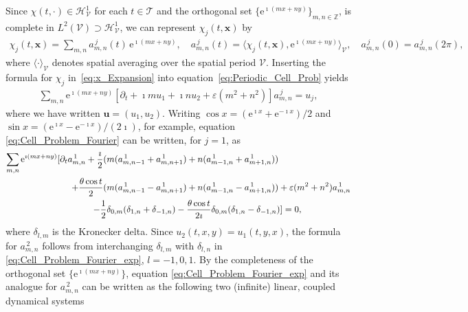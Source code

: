 \documentclass{article}
\newcommand{\e}{\mathrm{e}}
\newcommand{\Hc}{\mathcal{H}}
\newcommand{\Tc}{\mathcal{T}}
\newcommand{\Vc}{\mathcal{V}}
\newcommand{\vecx}{\mathbf{x}}
\newcommand{\vecu}{\mathbf{u}}
\begin{document}
Since $\chi(t,\cdot)\in\Hc^1_{\Vc}$ for each $t\in\Tc$ and the orthogonal set
$\{\e^{\imath (mx+ny)}\}_{m,n\in\mathbb{Z}}$, is complete in $L^2(\Vc)\supset\Hc^1_{\Vc}$, we can
represent $\chi_j(t,\vecx)$ by  
%
\begin{align}\label{eq:x_Expansion}
  \chi_j(t,\vecx)=\sum_{m,n}a^{\,j}_{m,n}(t)\,\e^{\imath (mx+ny)},
  \quad
  a^{\,j}_{m,n}(t)=\langle\chi_j(t,\vecx),\e^{\imath (mx+ny)}\rangle_{\Vc},
  \quad
  a^{\,j}_{m,n}(0)=a^{\,j}_{m,n}(2\pi),
\end{align}
%
where $\langle\cdot\rangle_{\Vc}$ denotes spatial averaging over the spatial period $\Vc$.
Inserting the formula for $\chi_j$ in~\eqref{eq:x_Expansion} into
equation~\eqref{eq:Periodic_Cell_Prob} yields  
%
\begin{align}\label{eq:Cell_Problem_Fourier}
  \sum_{m,n}\e^{\imath (mx+ny)}[\partial_t+\imath mu_1+\imath nu_2+\varepsilon(m^2+n^2)]a^{\,j}_{m,n}=u_j,
\end{align}
%
where we have written $\vecu=(u_1,u_2)$. Writing
$\cos{x}=(\e^{\imath x}+\e^{-\imath x})/2$ and $\sin{x}=(\e^{\imath x}-\e^{-\imath
  x})/(2\imath)$, for example, equation \eqref{eq:Cell_Problem_Fourier} can
be written, for $j=1$, as 
%
\begin{align}\label{eq:Cell_Problem_Fourier_exp}
  \sum_{m,n}\e^{\imath (mx+ny)}[
    \partial_ta^{\,1}_{m,n}
    +\frac{\imath}{2}(&m(a^{\,1}_{m,n-1}+a^{\,1}_{m,n+1})+n(a^{\,1}_{m-1,n}+a^{\,1}_{m+1,n}))
    \\
    +\frac{\theta\cos{t}}{2}(&m(a^{\,1}_{m,n-1}-a^{\,1}_{m,n+1})+n(a^{\,1}_{m-1,n}-a^{\,1}_{m+1,n}))
    +\varepsilon(m^2+n^2)a^{\,1}_{m,n}
    \notag\\
    -\frac{1}{2}&\delta_{0,m}(\delta_{1,n}+\delta_{-1,n})
          -\frac{\theta\cos{t}}{2\imath}\delta_{0,m}(\delta_{1,n}-\delta_{-1,n})]=0,
    \notag
\end{align}
%
where $\delta_{l,m}$ is the Kronecker delta.
Since $u_2(t,x,y)=u_1(t,y,x)$, the formula for
$a^{\,2}_{m,n}$ follows from interchanging $\delta_{l,m}$ with $\delta_{l,n}$ in
\eqref{eq:Cell_Problem_Fourier_exp}, $l=-1,0,1$. By the completeness of the orthogonal set
$\{\e^{\imath(mx+ny)}\}$, equation \eqref{eq:Cell_Problem_Fourier_exp} and
its analogue for $a^{\,2}_{m,n}$ can be written as the following two
(infinite) linear, coupled dynamical systems 
%
\end{document}
